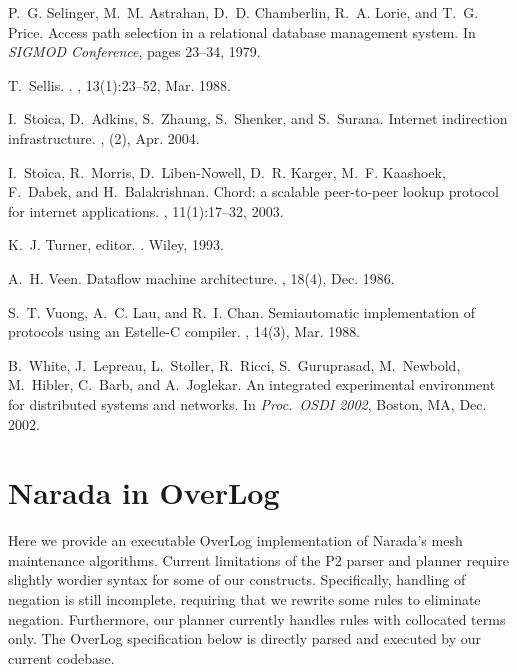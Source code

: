 \documentclass{sig-alt-full}
\def\Sys{P2\xspace}
\def\Lang{OverLog\xspace}
\begin{document}
{\begin{thebibliography}{10}
P.~G. Selinger, M.~M. Astrahan, D.~D. Chamberlin, R.~A. Lorie, and T.~G. Price.
\newblock Access path selection in a relational database management system.
\newblock In {\em SIGMOD Conference}, pages 23--34, 1979.

T.~Sellis.
.
, 13(1):23--52, Mar. 1988.

I.~Stoica, D.~Adkins, S.~Zhaung, S.~Shenker, and S.~Surana.
\newblock Internet indirection infrastructure.
, (2), Apr. 2004.

I.~Stoica, R.~Morris, D.~Liben-Nowell, D.~R. Karger, M.~F. Kaashoek, F.~Dabek,
  and H.~Balakrishnan.
\newblock Chord: a scalable peer-to-peer lookup protocol for internet
  applications.
, 11(1):17--32, 2003.

K.~J. Turner, editor.
.
\newblock Wiley, 1993.

A.~H. Veen.
\newblock Dataflow machine architecture.
, 18(4), Dec. 1986.

S.~T. Vuong, A.~C. Lau, and R.~I. Chan.
\newblock Semiautomatic implementation of protocols using an {E}stelle-{C}
  compiler.
, 14(3), Mar. 1988.

B.~White, J.~Lepreau, L.~Stoller, R.~Ricci, S.~Guruprasad, M.~Newbold,
  M.~Hibler, C.~Barb, and A.~Joglekar.
\newblock An integrated experimental environment for distributed systems and
  networks.
\newblock In {\em Proc.\ OSDI 2002}, Boston, MA, Dec. 2002.

\end{thebibliography}

}
\newpage
\appendix

\section{Narada in \Lang}
\label{sec:naradaOverlog}

Here we provide an executable \Lang implementation of Narada's mesh
maintenance algorithms. Current limitations of the \Sys parser and
planner require slightly wordier syntax for some of our 
constructs.  Specifically, handling of negation is still incomplete,
requiring that we rewrite some rules to eliminate negation.
Furthermore, our planner currently handles rules with collocated terms
only.  The \Lang specification below is directly parsed and executed by our
current codebase.
\end{document}
